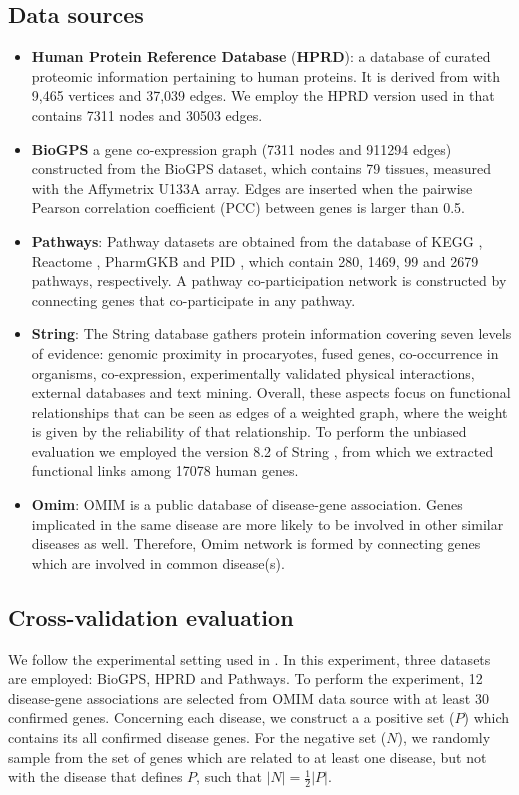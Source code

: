 \subsection*{Data sources}
\begin{itemize}
	\item \textbf{Human Protein Reference Database} (\textbf{HPRD}): a database of curated proteomic information pertaining to human proteins. It is derived from \cite{hprd1} with 9,465 vertices and 37,039 edges. We employ the HPRD version used in \cite{hprd2} that contains 7311 nodes and 30503 edges. 	
	
	\item \textbf{BioGPS} \cite{biogps1, biogps2} a gene co-expression graph (7311 nodes and 911294 edges) constructed from the BioGPS dataset, which contains 79 tissues, measured with
the Affymetrix U133A array. Edges are inserted when the pairwise Pearson
correlation coefficient (PCC) between genes is larger than 0.5.	
	
	\item \textbf{Pathways}: Pathway datasets are obtained from the database of KEGG \cite{kegg}, Reactome \cite{reactome}, PharmGKB \cite{pharmgkb} and PID \cite{pid}, which contain 280, 1469, 99 and 2679 pathways, respectively. A pathway co-participation network is constructed by connecting genes that co-participate in any pathway.
	\item \textbf{String}: The String database gathers protein information covering seven levels of evidence: genomic proximity in procaryotes, fused genes, co-occurrence in organisms, co-expression, experimentally validated physical interactions, external databases and text mining. Overall, these aspects focus on functional relationships that can be seen as edges of a weighted graph, where the weight is given by the reliability of that relationship. To perform the unbiased evaluation we employed the version 8.2 of String \cite{string}, from which we extracted functional links among 17078 human genes.
	\item \textbf{Omim}: OMIM is a public database of disease-gene association. Genes
implicated in the same disease are more likely to be involved in other
similar diseases as well. Therefore, Omim network is formed by connecting genes which are involved in common disease(s).
\end{itemize}

\subsection*{Cross-validation evaluation} We follow the experimental setting used in \cite{f3pc}. In this experiment, three datasets are employed: BioGPS, HPRD and Pathways. To perform the experiment, 12 disease-gene associations are selected from OMIM data source with at least 30 confirmed genes. Concerning each disease, we construct a a positive set ($P$) which contains its all confirmed disease genes. For the negative set ($N$), we randomly sample from the set of genes which are related to at least one disease, but not with the disease that defines $P$, such that $|N| = \frac{1}{2}|P|$. 

